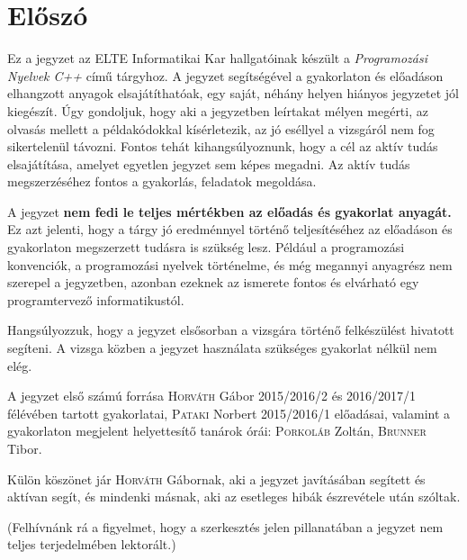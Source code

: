 \documentclass[../cpp_book/cpp_book.tex]{subfiles}
\begin{document}
	\section{Előszó}
	Ez a jegyzet az ELTE Informatikai Kar hallgatóinak készült a \emph{Programozási Nyelvek C++} című tárgyhoz. A jegyzet segítségével a gyakorlaton és előadáson elhangzott anyagok elsajátíthatóak, egy saját, néhány helyen hiányos jegyzetet jól kiegészít. Úgy gondoljuk, hogy aki a jegyzetben leírtakat mélyen megérti, az olvasás mellett a példakódokkal kísérletezik, az jó eséllyel a vizsgáról nem fog sikertelenül távozni. Fontos tehát kihangsúlyoznunk, hogy a cél az aktív tudás elsajátítása, amelyet egyetlen jegyzet sem képes megadni. Az aktív tudás megszerzéséhez fontos a gyakorlás, feladatok megoldása.
	
	A jegyzet \textbf{nem fedi le teljes mértékben az előadás és gyakorlat anyagát.} Ez azt jelenti, hogy a tárgy jó eredménnyel történő teljesítéséhez az előadáson és gyakorlaton megszerzett tudásra is szükség lesz. Például a programozási konvenciók, a programozási nyelvek történelme, és még megannyi anyagrész nem szerepel a jegyzetben, azonban ezeknek az ismerete fontos és elvárható egy programtervező informatikustól.
	
	\smallskip
	Hangsúlyozzuk, hogy a jegyzet elsősorban a vizsgára történő felkészülést hivatott segíteni. A vizsga közben a jegyzet használata szükséges gyakorlat nélkül nem elég.
	
	\smallskip
	A jegyzet első számú forrása \textsc{Horváth} Gábor 2015/2016/2 és 2016/2017/1 félévében tartott gyakorlatai, \textsc{Pataki} Norbert 2015/2016/1 előadásai, valamint a gyakorlaton megjelent helyettesítő tanárok órái: \textsc{Porkoláb} Zoltán, \textsc{Brunner} Tibor.
	
	Külön köszönet jár \textsc{Horváth} Gábornak, aki a jegyzet javításában segített és aktívan segít, és mindenki másnak, aki az esetleges hibák észrevétele után szóltak.
	
	(Felhívnánk rá a figyelmet, hogy a szerkesztés jelen pillanatában a jegyzet nem teljes terjedelmében lektorált.)
\end{document}
